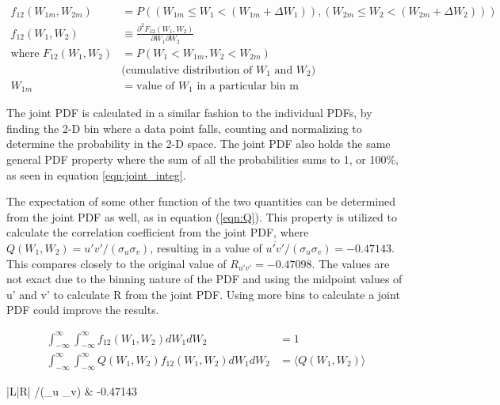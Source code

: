 \documentclass[conf]{new-aiaa}
\begin{document}
\begin{align} 
	f_{12}(W_{1m},W_{2m}) &= P((W_{1m} \leq W_1 < (W_{1m}+\Delta W_1)),(W_{2m} \leq W_2 < (W_{2m}+\Delta W_2))) \label{eqn:joint_discrete} \\
	f_{12}(W_{1},W_{2}) &\equiv \frac{\partial^2F_{12}(W_1,W_2)}{\partial W_1 \partial W_2} \label{eqn:joint_cont} \\
	\text{where\ \ \ \ }
	F_{12}(W_1,W_2) &= P(W_1<W_{1m},W_2<W_{2m}) \nonumber\\
	& \text{(cumulative distribution of $W_1$ and $W_2$)} \nonumber \\
	W_{1m} &= \text{value of $W_1$ in a particular bin m}
\end{align}

The joint PDF is calculated in a similar fashion to the individual PDFs, by finding the 2-D bin where a data point falls, counting and normalizing to determine the probability in the 2-D space.  The joint PDF also holds the same general PDF property where the sum of all the probabilities sums to 1, or 100\%, as seen in equation \ref{eqn:joint_integ}.

The expectation of some other function of the two quantities can be determined from the joint PDF as well, as in equation (\ref{eqn:Q}).  This property is utilized to calculate the correlation coefficient from the joint PDF, where $Q(W_1,W_2) = u'v'/(\sigma_u \sigma_v)$, resulting in a value of $\overline{u'v'}/(\sigma_u \sigma_v) = -0.47143$.  This compares closely to the original value of $R_{u'v'} = -0.47098$.  The values are not exact due to the binning nature of the PDF and using the midpoint values of u' and v' to calculate R from the joint PDF.  Using more bins to calculate a joint PDF could improve the results.

\begin{align} 
	\int_{-\infty}^{\infty} \int_{-\infty}^{\infty} f_{12}(W_1,W_2)dW_1dW_2 &= 1 \label{eqn:joint_integ} \\
	\int_{-\infty}^{\infty} \int_{-\infty}^{\infty} Q(W_1,W_2)f_{12}(W_1,W_2)dW_1dW_2 &= \langle Q(W_1,W_2) \rangle \label{eqn:Q}
\end{align}

\begin{table}[H]
\centering
\begin{tabular}{|L|R|}
	\hline
	/(\sigma_u \sigma_v) & -0.47143 \\
	\hline
\end{tabular}
	\caption{R from joint PDF}
\label{tbl:jointR}
\end{table}
\end{document}
